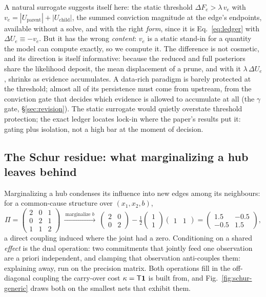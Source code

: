 A natural surrogate suggests itself here: the static threshold $\Delta F_e > \lambda\,v_e$ with
$v_e = |U_{\mathrm{parent}}|+|U_{\mathrm{child}}|$, the summed conviction magnitude at the
edge's endpoints, available without a solve, and with the
right \emph{form}, since it is Eq.~\eqref{eq:ledger} with $\Delta U_e \equiv -v_e$. But it has
the wrong \emph{content}: $v_e$ is a static stand-in for a quantity the model can compute exactly,
so we compute it. The difference is not cosmetic, and its direction is itself informative:
because the reduced and full posteriors share the likelihood deposit, the mean displacement of
a prune, and with it $\lambda\,\Delta U_e$, shrinks as evidence accumulates. A
data-rich paradigm is barely protected at the threshold; almost all of its persistence must
come from upstream, from the conviction gate that decides which evidence is allowed to
accumulate at all (the $\gamma$ gate, \S\ref{sec:revision}). The static surrogate would quietly overstate threshold
protection; the exact ledger locates lock-in where the paper's results put it: gating plus
isolation, not a high bar at the moment of decision.

\subsection{The Schur residue: what marginalizing a hub leaves behind}

Marginalizing a hub condenses its influence into new edges among its neighbours: for a
common-cause structure over $(x_1,x_2,b)$,
\begin{equation}
\Pi=\begin{pmatrix}2&0&1\\0&2&1\\1&1&2\end{pmatrix}
\ \xrightarrow{\ \text{marginalize } b\ }\
\begin{pmatrix}2&0\\0&2\end{pmatrix}-\tfrac12\begin{pmatrix}1\\1\end{pmatrix}\begin{pmatrix}1&1\end{pmatrix}
=\begin{pmatrix}1.5&-0.5\\-0.5&1.5\end{pmatrix},
\label{eq:schur}
\end{equation}
a direct coupling induced where the joint had a zero. Conditioning on a shared \emph{effect} is the
dual operation: two commitments that jointly feed one observation are a priori independent, and
clamping that observation anti-couples them: explaining away, run on the precision matrix. Both
operations fill in the off-diagonal coupling the carry-over cost $\kappa=\mathsf{T}\mathbf{1}$ is built
from, and Fig.~\ref{fig:schur-generic} draws both on the smallest nets that exhibit them.


